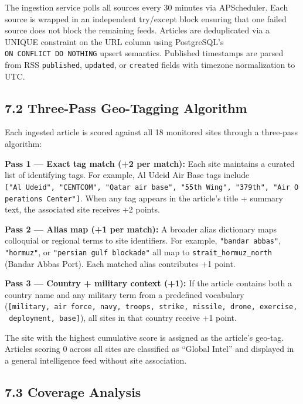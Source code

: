 \documentclass[11pt,a4paper]{article}
\begin{document}
The ingestion service polls all sources every 30 minutes via APScheduler. Each source is wrapped in an independent try/except block ensuring that one failed source does not block the remaining feeds. Articles are deduplicated via a UNIQUE constraint on the URL column using PostgreSQL's \texttt{ON\ CONFLICT\ DO\ NOTHING} upsert semantics. Published timestamps are parsed from RSS \texttt{published}, \texttt{updated}, or \texttt{created} fields with timezone normalization to UTC.

\hypertarget{three-pass-geo-tagging-algorithm}{%
\subsection{7.2 Three-Pass Geo-Tagging Algorithm}\label{three-pass-geo-tagging-algorithm}}

Each ingested article is scored against all 18 monitored sites through a three-pass algorithm:

\textbf{Pass 1 --- Exact tag match (+2 per match):}
Each site maintains a curated list of identifying tags. For example, Al Udeid Air Base tags include \texttt{{[}"Al\ Udeid",\ "CENTCOM",\ "Qatar\ air\ base",\ "55th\ Wing",\ "379th",\ "Air\ Operations\ Center"{]}}. When any tag appears in the article's title + summary text, the associated site receives +2 points.

\textbf{Pass 2 --- Alias map (+1 per match):}
A broader alias dictionary maps colloquial or regional terms to site identifiers. For example, \texttt{"bandar\ abbas"}, \texttt{"hormuz"}, or \texttt{"persian\ gulf\ blockade"} all map to \texttt{strait\_hormuz\_north} (Bandar Abbas Port). Each matched alias contributes +1 point.

\textbf{Pass 3 --- Country + military context (+1):}
If the article contains both a country name and any military term from a predefined vocabulary (\texttt{{[}military,\ air\ force,\ navy,\ troops,\ strike,\ missile,\ drone,\ exercise,\ deployment,\ base{]}}), all sites in that country receive +1 point.

The site with the highest cumulative score is assigned as the article's geo-tag. Articles scoring 0 across all sites are classified as ``Global Intel'' and displayed in a general intelligence feed without site association.

\hypertarget{coverage-analysis}{%
\subsection{7.3 Coverage Analysis}\label{coverage-analysis}}
\end{document}
